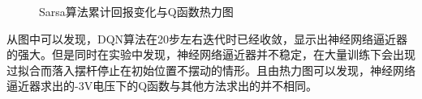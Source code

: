 \documentclass[conference,10pt]{IEEEtran}
\begin{document}
\begin{figure}[H]
	\centering
	\centering
	\caption{Sarsa算法累计回报变化与Q函数热力图}
	\label{DQNheat}
\end{figure}
从图中可以发现，DQN算法在20步左右迭代时已经收敛，显示出神经网络逼近器的强大。但是同时在实验中发现，神经网络逼近器并不稳定，在大量训练下会出现过拟合而落入摆杆停止在初始位置不摆动的情形。且由热力图可以发现，神经网络逼近器求出的-3V电压下的Q函数与其他方法求出的并不相同。
\end{document}
